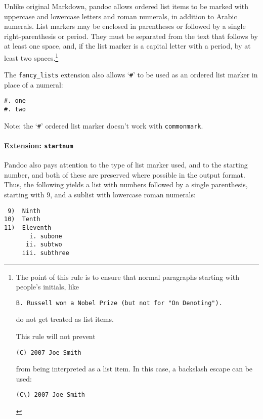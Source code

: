 \documentclass[
  a4paper,
]{article}
\begin{document}
Unlike original Markdown, pandoc allows ordered list items to be marked
with uppercase and lowercase letters and roman numerals, in addition to
Arabic numerals. List markers may be enclosed in parentheses or followed
by a single right-parenthesis or period. They must be separated from the
text that follows by at least one space, and, if the list marker is a
capital letter with a period, by at least two spaces.\footnote{The point
  of this rule is to ensure that normal paragraphs starting with
  people's initials, like

\begin{Verbatim}
B. Russell won a Nobel Prize (but not for "On Denoting").
\end{Verbatim}

  do not get treated as list items.

  This rule will not prevent

\begin{Verbatim}
(C) 2007 Joe Smith
\end{Verbatim}

  from being interpreted as a list item. In this case, a backslash
  escape can be used:

\begin{Verbatim}
(C\) 2007 Joe Smith
\end{Verbatim}
}

The \texttt{fancy\_lists} extension also allows `\texttt{\#}' to be used
as an ordered list marker in place of a numeral:

\begin{verbatim}
#. one
#. two
\end{verbatim}

Note: the `\texttt{\#}' ordered list marker doesn't work with
\texttt{commonmark}.

\hypertarget{extension-startnum}{%
\paragraph{\texorpdfstring{Extension:
\texttt{startnum}}{Extension: startnum}}\label{extension-startnum}}

Pandoc also pays attention to the type of list marker used, and to the
starting number, and both of these are preserved where possible in the
output format. Thus, the following yields a list with numbers followed
by a single parenthesis, starting with 9, and a sublist with lowercase
roman numerals:

\begin{verbatim}
 9)  Ninth
10)  Tenth
11)  Eleventh
       i. subone
      ii. subtwo
     iii. subthree
\end{verbatim}
\end{document}
